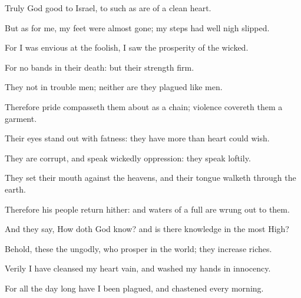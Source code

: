 {\Q {}Truly
God
{}
good to
Israel,
{} to such as are of a
clean
heart.


\par }{\Q {}But as for me, my
feet were
almost
gone; my
steps had well
nigh
slipped.


\par }{\Q {}For I was
envious at the
foolish,
{} I
saw the
prosperity of the
wicked.


\par }{\Q {}For
{} no
bands in their
death: but their
strength
{}
firm.


\par }{\Q {}They
{} not in
trouble
{}
men; neither are they
plagued
like
{}
men.


\par }{\Q {}Therefore
pride compasseth them about as a
chain;
violence
covereth them
{} a
garment.


\par }{\Q {}Their
eyes stand
out with
fatness: they have
more than
heart could
wish.


\par }{\Q {}They are
corrupt, and
speak
wickedly
{}
oppression: they
speak
loftily.


\par }{\Q {}They
set their
mouth against the
heavens, and their
tongue
walketh through the
earth.


\par }{\Q {}Therefore his
people
return
hither: and
waters of a
full
{} are wrung
out to them.


\par }{\Q {}And they
say, How doth
God
know? and is
there
knowledge in the most
High?


\par }{\Q {}Behold, these
{} the
ungodly, who
prosper in the
world; they
increase
{}
riches.


\par }{\Q {}Verily I have
cleansed my
heart
{}
vain, and
washed my
hands in
innocency.


\par }{\Q {}For all the
day long have I been
plagued, and
chastened every
morning.


\par }{\BB \par }
